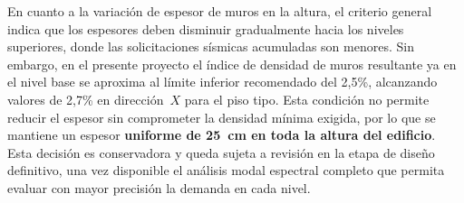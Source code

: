 En cuanto a la variación de espesor de muros en la altura, el criterio 
general indica que los espesores deben disminuir gradualmente hacia los 
niveles superiores, donde las solicitaciones sísmicas acumuladas son 
menores. Sin embargo, en el presente proyecto el índice de densidad de 
muros resultante ya en el nivel base se aproxima al límite inferior 
recomendado del 2{,}5\%, alcanzando valores de 2{,}7\% en dirección~$X$ 
para el piso tipo. Esta condición no permite reducir el espesor sin 
comprometer la densidad mínima exigida, por lo que se mantiene un espesor 
\textbf{uniforme de 25~cm en toda la altura del edificio}. Esta decisión 
es conservadora y queda sujeta a revisión en la etapa de diseño definitivo, 
una vez disponible el análisis modal espectral completo que permita 
evaluar con mayor precisión la demanda en cada nivel.
